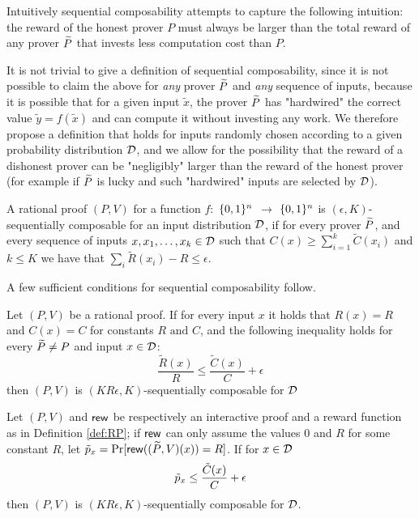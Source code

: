 

Intuitively sequential composability attempts to capture the following intuition: the reward of the honest prover $P$ must always be larger than the total  reward of any prover $\widetilde{P}$ that invests less computation cost than $P$.


It is not trivial to give a definition of sequential composability, since it is not possible to claim the above for {\em any} prover $\widetilde{P}$ and {\em any} sequence of inputs, because it
is possible that for a given input $\tilde{x}$, the prover $\widetilde{P}$ has "hardwired" the correct value $\tilde{y}=f(\tilde{x})$ and can compute it without investing 
any work. We therefore propose a definition that holds for inputs randomly chosen according to a given probability distribution $\cal D$, and we allow for
the possibility that the reward of a dishonest prover can be "negligibly" larger than the reward of the honest prover (for example if $\widetilde{P}$ is lucky and such 
"hardwired" inputs are selected by $\cal D$).

\noindent
\begin{definition}
\label{def:SRP}
A rational proof $(P,V)$ for a function $f:$ $\{0, 1\}^n$ $\to$ 
$\{0, 1\}^n$ is $(\epsilon, K)$-{\sf sequentially composable} for an input distribution $\cal D$, if for every prover $\widetilde{P}$, 
and every sequence of inputs 
$x,x_1,\ldots,x_k \in {\cal D}$ such that $C(x) \geq \sum_{i=1}^k 
\tilde{C}(x_i)$ and $k \leq K$ we have that $\sum_{i}\tilde{R}(x_i) - R \leq \epsilon$.
\end{definition}

\noindent
A few sufficient conditions for sequential composability follow.

\begin{lemma}
\label{lemma:cost-rew-ratios}
Let $(P,V)$ be a rational proof.
If for every input $x$  it holds that $R(x)=R$ and  $C(x)=C$ for constants 
$R \mbox{ and } C$, and the 
following inequality holds for every 
$\widetilde{P}\neq 
P$ and input $x\in {\cal D}$:
\[ \frac{\tilde{R}(x)}{R} \leq \frac{\tilde{C}(x)}{C} + \epsilon\]
then $(P,V)$ is $(KR\epsilon, K)$-sequentially composable for $\cal D$
\end{lemma}

\begin{corollary}
\label{cor:prob}
Let $(P,V)$ and $\mathsf{rew}$ be respectively an interactive proof and a reward 
function as in 
Definition \ref{def:RP}; if $\mathsf{rew}$ can only assume the values $0$ and $R$ for 
some constant $R$, let $\tilde{p}_x = \Pr[\mathsf{rew}((\widetilde{P},V)(x)) = R]$. If for $x \in {\cal D}$
$$  \tilde{p}_x \leq \frac{\tilde{C}(x)}{C} + \epsilon $$
then $(P,V)$ is $(KR\epsilon, K)$-sequentially composable for $\cal D$. 
\end{corollary}


